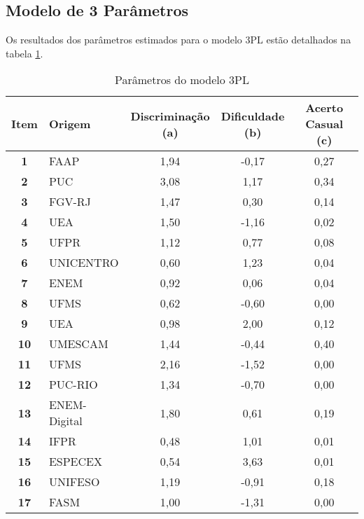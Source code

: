 \subsection{Modelo de 3 Parâmetros}

Os resultados dos parâmetros estimados para o modelo 3PL estão detalhados na tabela \ref{tabela-coef3}.

\begin{table}[!htb]
	\centering
		\caption{Parâmetros do modelo 3PL}
		\label{tabela-coef3}

		\begin{tabular*}{.9\textwidth}{@{\extracolsep{\fill}}clccc@{}}
			\toprule
			\textbf{Item}  & \textbf{Origem} & 
		   \makecell{\textbf{Discriminação} \\\textbf{(a)}}& 
			\makecell{\textbf{Dificuldade} \\ \textbf{(b)}} &
			 \makecell{\textbf{Acerto Casual} \\\textbf{(c)}} 
			   \\ 
		\hline \textbf{1 }& FAAP & 1,94 & -0,17 & 0,27 \\ 
		\hline \textbf{2 }& PUC & 3,08 & 1,17 & 0,34 \\ 
		\hline \textbf{3 }& FGV-RJ & 1,47 & 0,30 & 0,14  \\ 
		\hline \textbf{4 }& UEA & 1,50 & -1,16 & 0,02  \\ 
		\hline \textbf{5 }& UFPR & 1,12 & 0,77 & 0,08 \\ 
		\hline \textbf{6 }& UNICENTRO & 0,60 & 1,23 & 0,04  \\ 
		\hline \textbf{7 }& ENEM & 0,92 & 0,06 & 0,04 \\ 
		\hline \textbf{8 }& UFMS & 0,62 & -0,60 & 0,00 \\ 
		\hline \textbf{9 }& UEA & 0,98 & 2,00 & 0,12  \\ 
		\hline \textbf{10} & UMESCAM & 1,44 & -0,44 & 0,40 \\ 
		\hline \textbf{11} & UFMS & 2,16 & -1,52 & 0,00  \\ 
		\hline \textbf{12} & PUC-RIO & 1,34 & -0,70 & 0,00 \\ 
		\hline \textbf{13} & ENEM-Digital & 1,80 & 0,61 & 0,19 \\ 
		\hline \textbf{14} & IFPR & 0,48 & 1,01 & 0,01  \\ 
		\hline \textbf{15} & ESPECEX & 0,54 & 3,63 & 0,01 \\ 
		\hline \textbf{16} & UNIFESO & 1,19 & -0,91 & 0,18  \\ 
		\hline \textbf{17} & FASM & 1,00 & -1,31 & 0,00  \\ 

\end{tabular*}
\end{table}
